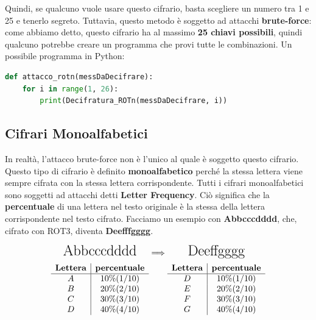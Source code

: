 \documentclass{rapport}
\begin{document}
Quindi, se qualcuno vuole usare questo cifrario, basta scegliere un numero tra 1 e 25 e tenerlo segreto.  
Tuttavia, questo metodo è soggetto ad attacchi \textbf{brute-force}: come abbiamo detto, questo cifrario ha al massimo \textbf{25 chiavi possibili}, quindi qualcuno potrebbe creare un programma che provi tutte le combinazioni.  
Un possibile programma in Python:


\begin{lstlisting}[language=Python]
def attacco_rotn(messDaDecifrare):
    for i in range(1, 26):
        print(Decifratura_ROTn(messDaDecifrare, i))
\end{lstlisting}


\newpage

\subsection{Cifrari Monoalfabetici}
In realtà, l'attacco brute-force non è l'unico al quale è soggetto questo cifrario.  
Questo tipo di cifrario è definito \textbf{monoalfabetico} perché la stessa lettera viene sempre cifrata con la stessa lettera corrispondente.  
Tutti i cifrari monoalfabetici sono soggetti ad attacchi detti \textbf{Letter Frequency}.  
Ciò significa che la \textbf{percentuale} di una lettera nel testo originale è la stessa della lettera corrispondente nel testo cifrato.  
Facciamo un esempio con \textbf{Abbcccdddd}, che, cifrato con ROT3, diventa \textbf{Deefffgggg}.

\vspace{0.2cm}
\[
\begin{array}{c@{\hskip 0.1cm}c@{\hskip 0.1cm}c}
  \text{\LARGE Abbcccdddd} & \Longrightarrow & \text{\LARGE Deeffgggg} \\[0.2cm]

  \begin{array}{c|c}
    \textbf{Lettera} & \textbf{percentuale} \\
    \hline
    A & 10\% (1/10) \\
    B & 20\% (2/10) \\
    C & 30\% (3/10) \\
    D & 40\% (4/10) \\
  \end{array}
  &
  &
  \begin{array}{c|c}
    \textbf{Lettera} & \textbf{percentuale} \\
    \hline
    D & 10\% (1/10) \\
    E & 20\% (2/10) \\
    F & 30\% (3/10) \\
    G & 40\% (4/10) \\
  \end{array}
\end{array}
\]
\end{document}
